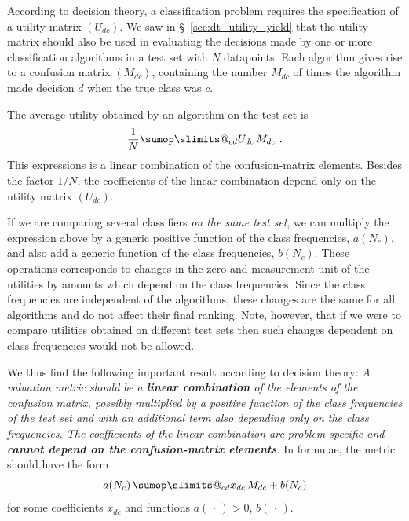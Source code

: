 \documentclass[\ifafour a4paper,12pt,\else a5paper,10pt,\fi%
onecolumn,oneside,article,%
british%
]{memoir}
\makeatletter
\theoremstyle{remark}
\theoremstyle{innote}
\def\sum{\DOTSI\sumop\slimits@}
\newcommand*{\dotv}{\mathord{\,\cdot\,}}%
\renewcommand*{\|}[1][]{\nonscript\:#1\vert\nonscript\:\mathopen{}}
\newcommand*{\sect}{\S}%
\makeatother
\begin{document}
According to decision theory, a classification problem requires the specification of a utility matrix $(U_{dc})$. We saw in \sect~\ref{sec:dt_utility_yield} that the utility matrix should also be used in evaluating the decisions made by one or more classification algorithms in a test set with $N$ datapoints. Each algorithm gives rise to a confusion matrix $(M_{dc})$, containing the number $M_{dc}$ of times the algorithm made decision $d$ when the true class was $c$.

The  average utility obtained by an algorithm on the test set is
\begin{equation}
  \label{eq:utility_testset}
  \frac{1}{N}\sum_{cd} U_{dc}\, M_{dc} \ .
\end{equation}
This expressions is a linear combination of the confusion-matrix elements. Besides the factor $1/N$, the coefficients of the linear combination depend only on the utility matrix $(U_{dc})$.

If we are comparing several classifiers \emph{on the same test set}, we can multiply the expression above by a generic positive function of the class frequencies, $a(N_{c})$, and also add a generic function of the class frequencies, $b(N_{c})$. These operations corresponds to changes in the zero and  measurement unit of the utilities by amounts which depend on the class frequencies. Since the class frequencies are independent of the algorithms, these changes are the same for all algorithms and do not affect their final ranking. Note, however, that if we were to compare utilities obtained on different test sets then such changes dependent on class frequencies would not be allowed.

We thus find the following important result according to decision theory: \emph{A valuation metric should be a \textbf{linear combination} of the elements of the confusion matrix, possibly multiplied by a positive function of the class frequencies of the test set and with an additional term also depending only on the class frequencies. The coefficients of the linear combination are problem-specific and \textbf{cannot depend on the confusion-matrix elements}.} In formulae, the metric should have the form
\begin{equation}
  \label{eq:general_valuation_metric}
  a(N_{c})\, \sum_{cd} x_{dc}\, M_{dc} +  b(N_{c})
\end{equation}
for some coefficients $x_{dc}$ and functions $a(\dotv)>0$,\; $b(\dotv)$.
\end{document}
